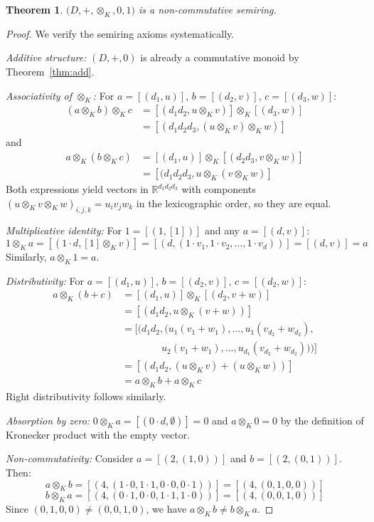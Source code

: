 \documentclass[11pt]{article}
\newtheorem{theorem}{Theorem}[section]
\begin{document}
\begin{theorem}
\(\bigl(D,+,
\otimes_K,0,1\bigr)\) is a non‑commutative semiring.
\end{theorem}
\begin{proof}
We verify the semiring axioms systematically.

\textit{Additive structure:} $(D,+,0)$ is already a commutative monoid by Theorem~\ref{thm:add}.

\textit{Associativity of $\otimes_K$:} For $a = [(d_1,u)]$, $b = [(d_2,v)]$, $c = [(d_3,w)] $:
\begin{align}
(a \otimes_K b) \otimes_K c &= [(d_1 d_2, u \otimes_K v)] \otimes_K [(d_3,w)] \\
&= [(d_1 d_2 d_3, (u \otimes_K v) \otimes_K w)]
\end{align}
and
\begin{align}
a \otimes_K (b \otimes_K c) &= [(d_1,u)] \otimes_K [(d_2 d_3, v \otimes_K w)] \\
&= [(d_1 d_2 d_3, u \otimes_K (v \otimes_K w)]
\end{align}
Both expressions yield vectors in $\mathbb{R}^{d_1 d_2 d_3}$ with components $(u \otimes_K v \otimes_K w)_{i,j,k} = u_i v_j w_k$ in the lexicographic order, so they are equal.

\textit{Multiplicative identity:} For $1 = [(1,[1])]$ and any $a = [(d,v)] $:
\[1 \otimes_K a = [(1 \cdot d, [1] \otimes_K v)] = [(d, (1 \cdot v_1, 1 \cdot v_2, \ldots, 1 \cdot v_d))] = [(d,v)] = a\]
Similarly, $a \otimes_K 1 = a$.

\textit{Distributivity:} For $a = [(d_1,u)]$, $b = [(d_2,v)]$, $c = [(d_2,w)] $:
\begin{align}
a \otimes_K (b + c) &= [(d_1,u)] \otimes_K [(d_2, v + w)] \\
&= [(d_1 d_2, u \otimes_K (v + w))] \\
&= [(d_1 d_2, (u_1(v_1 + w_1), \ldots, u_1(v_{d_2} + w_{d_2}), \\
&\qquad\qquad u_2(v_1 + w_1), \ldots, u_{d_1}(v_{d_2} + w_{d_2})))] \\
&= [(d_1 d_2, (u \otimes_K v) + (u \otimes_K w))] \\
&= a \otimes_K b + a \otimes_K c
\end{align}
Right distributivity follows similarly.

\textit{Absorption by zero:} $0 \otimes_K a = [(0 \cdot d, \emptyset)] = 0$ and $a \otimes_K 0 = 0$ by the definition of Kronecker product with the empty vector.

\textit{Non-commutativity:} Consider $a = [(2, (1,0))]$ and $b = [(2, (0,1))]$. Then:
\[a \otimes_K b = [(4, (1 \cdot 0, 1 \cdot 1, 0 \cdot 0, 0 \cdot 1))] = [(4, (0,1,0,0))]\]
\[b \otimes_K a = [(4, (0 \cdot 1, 0 \cdot 0, 1 \cdot 1, 1 \cdot 0))] = [(4, (0,0,1,0))]\]
Since $(0,1,0,0) \neq (0,0,1,0)$, we have $a \otimes_K b \neq b \otimes_K a$.
\end{proof}
\end{document}
